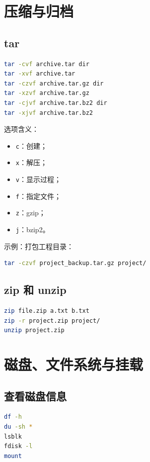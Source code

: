 \documentclass[UTF8,a4paper,12pt]{ctexart}
\begin{document}
\section{压缩与归档}

\subsection{tar}

\begin{lstlisting}[language=bash]
tar -cvf archive.tar dir
tar -xvf archive.tar
tar -czvf archive.tar.gz dir
tar -xzvf archive.tar.gz
tar -cjvf archive.tar.bz2 dir
tar -xjvf archive.tar.bz2
\end{lstlisting}

选项含义：
\begin{itemize}
    \item \texttt{c}：创建；
    \item \texttt{x}：解压；
    \item \texttt{v}：显示过程；
    \item \texttt{f}：指定文件；
    \item \texttt{z}：gzip；
    \item \texttt{j}：bzip2。
\end{itemize}

示例：打包工程目录：

\begin{lstlisting}[language=bash]
tar -czvf project_backup.tar.gz project/
\end{lstlisting}

\subsection{zip 和 unzip}

\begin{lstlisting}[language=bash]
zip file.zip a.txt b.txt
zip -r project.zip project/
unzip project.zip
\end{lstlisting}

\section{磁盘、文件系统与挂载}

\subsection{查看磁盘信息}

\begin{lstlisting}[language=bash]
df -h
du -sh *
lsblk
fdisk -l
mount
\end{lstlisting}
\end{document}
